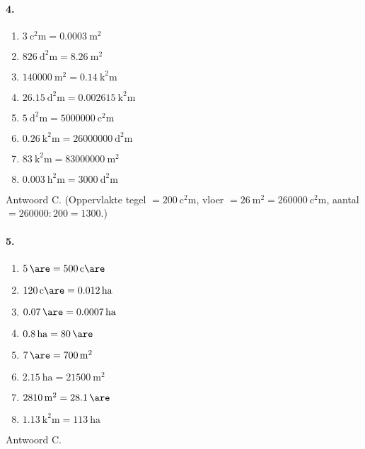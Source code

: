 \documentclass[a4paper,12pt]{article}
\begin{document}
\paragraph{4.}
\begin{multicols}{2}
\begin{enumerate}
  \item \(\SI{3}{\square\centi\metre}=\SI{0.0003}{\square\metre}\)
  \item \(\SI{826}{\square\deci\metre}=\SI{8.26}{\square\metre}\)
  \item \(\SI{140000}{\square\metre}=\SI{0.14}{\square\kilo\metre}\)
  \item \(\SI{26.15}{\square\deca\metre}=\SI{0.002615}{\square\kilo\metre}\)
  \item \(\SI{5}{\square\deca\metre}=\SI{5000000}{\square\centi\metre}\)
  \item \(\SI{0.26}{\square\kilo\metre}=\SI{26000000}{\square\deci\metre}\)
  \item \(\SI{83}{\square\kilo\metre}=\SI{83000000}{\square\metre}\)
  \item \(\SI{0.003}{\square\hecto\metre}=\SI{3000}{\square\deci\metre}\)
\end{enumerate}
\end{multicols}
Antwoord C. (Oppervlakte tegel \(=\SI{200}{\square\centi\metre}\), vloer \(=\SI{26}{\square\metre}=\SI{260000}{\square\centi\metre}\), aantal \(=\num{260000}:\num{200}=\num{1300}\).)

\paragraph{5.}
\begin{multicols}{2}
\begin{enumerate}
  \item \(\SI{5}{\are}=\SI{500}{\centi\are}\)
  \item \(\SI{120}{\centi\are}=\SI{0.012}{\hectare}\)
  \item \(\SI{0.07}{\are}=\SI{0.0007}{\hectare}\)
  \item \(\SI{0.8}{\hectare}=\SI{80}{\are}\)
  \item \(\SI{7}{\are}=\SI{700}{\square\metre}\)
  \item \(\SI{2.15}{\hectare}=\SI{21500}{\square\metre}\)
  \item \(\SI{2810}{\square\metre}=\SI{28.1}{\are}\)
  \item \(\SI{1.13}{\square\kilo\metre}=\SI{113}{\hectare}\)
\end{enumerate}
\end{multicols}
Antwoord C.
\end{document}
